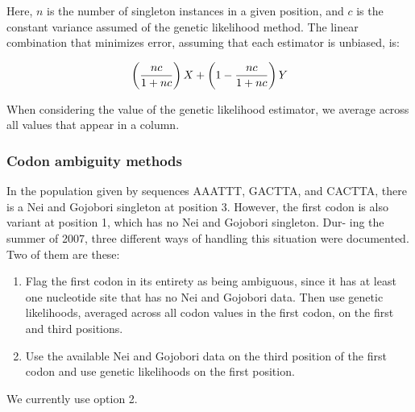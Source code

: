 \documentclass{article}
\begin{document}
	Here, $n$ is the number of singleton instances in a given position, and
	$c$ is the constant variance assumed of the genetic likelihood method.
	The linear combination that minimizes error, assuming that each
	estimator is unbiased, is:

	$$ \left( {nc \over 1 + nc} \right) X + \left (1 - {nc \over 1 +
	    nc}\right) Y $$

	When considering the value of the genetic likelihood estimator, we
	average across all values that appear in a column.

      \subsubsection{Codon ambiguity methods}
	\label{sec:codon-ambiguity}

	In the population given by sequences AAATTT, GACTTA, and CACTTA,
	there is a Nei and Gojobori singleton at position 3. However, the first codon
	is also variant at position 1, which has no Nei and Gojobori singleton. Dur-
	ing the summer of 2007, three different ways of handling this situation were
	documented. Two of them are these:

	\begin{enumerate}
	  \item Flag the first codon in its entirety as being ambiguous, since
	  it has at least one nucleotide site that has no Nei and Gojobori data.
	  Then use genetic likelihoods, averaged across all codon values in the
	  first codon, on the first and third positions.

	  \item Use the available Nei and Gojobori data on the third position of
	  the first codon and use genetic likelihoods on the first position.
	\end{enumerate}

	We currently use option 2.
\end{document}
